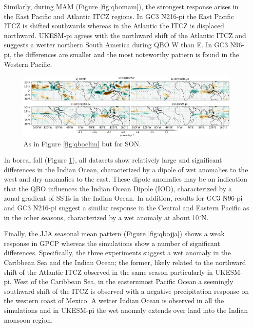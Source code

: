 Similarly, during MAM (Figure \ref{fig:qbomam}), the strongest response arises in the East Pacific and Atlantic ITCZ regions. In GC3 N216-pi the East Pacific ITCZ is shifted southwards whereas in the Atlantic the ITCZ is displaced northward. UKESM-pi agrees with the northward shift of the Atlantic ITCZ and suggests a wetter northern South America during QBO W than E. In GC3 N96-pi, the differences are smaller and the most noteworthy pattern is found in the Western Pacific. 


\begin{figure}[t!]
\centering
 \includegraphics[width=\linewidth]{figures/piprsonqbowqboe.png}
\caption[SON mean precipitation composite difference QBO W-E ]{ As in Figure \ref{fig:qboclim} but for SON. }
\label{fig:qboson}
\end{figure}


In boreal fall (Figure \ref{fig:qboson}), all datasets show relatively large and significant differences in the Indian Ocean, characterized by a dipole of wet anomalies to the west and dry anomalies to the east. These dipole anomalies may be an indication that the QBO influences the Indian Ocean Dipole (IOD), characterized by a zonal gradient of SSTs in the Indian Ocean. In addition, results for GC3 N96-pi and GC3 N216-pi suggest a similar response in the Central and Eastern Pacific as in the other seasons, characterized by a wet anomaly at about 10$^\circ$N.

Finally, the JJA seasonal mean pattern (Figure \ref{fig:qbojja}) shows a weak response in GPCP whereas the simulations show a number of significant differences. Specifically, the three experiments suggest a wet anomaly in the Caribbean Sea and the Indian Ocean; the former, likely related to the northward shift of the Atlantic ITCZ observed in the same season particularly in UKESM-pi. West of the Caribbean Sea, in the easternmost Pacific Ocean a seemingly southward shift of the ITCZ is observed with a negative precipitation response on the western coast of Mexico.
A wetter Indian Ocean is observed in all the simulations and in UKESM-pi the wet anomaly extends over land into the Indian monsoon region.

